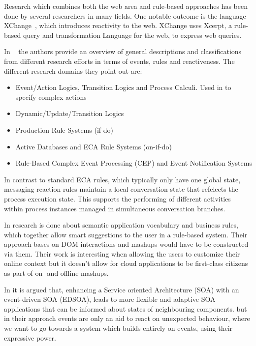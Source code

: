 \documentclass[11pt]{article}%
\begin{document}
Research which combines both the web area and rule-based approaches has been done by several researchers in many fields. One notable outcome is the language XChange~\cite{2005-Bry_etal-XChange.pdf}, which introduces reactivity to the web. XChange uses Xcerpt\cite{2004-Schaffert-Xcerpt.pdf}, a rule-based query and transformation Language for the web, to express web queries.

In ~\cite{2009-Paschke_Boley-RCER.pdf} the authors provide an overview of general descriptions and classifications from different research efforts in terms of events, rules and reactiveness. The different research domains they point out are:
 \begin{itemize}
  \item Event/Action Logics, Transition Logics and Process Calculi. Used in \cite{Behrends:2008:EEA:1377798.1377801} to specify complex actions
  \item Dynamic/Update/Transition Logics
  \item Production Rule Systems (if-do)
  \item Active Databases and ECA Rule Systems (on-if-do)
  \item Rule-Based Complex Event Processing (CEP) and Event Notification Systems
\end{itemize}
In contrast to standard ECA rules, which typically only have one global state, messaging reaction rules maintain a local conversation state that refelects the process execution state. This supports the performing of different activities within process instances managed in simultaneous conversation branches.

In \cite{2012-Giurca_etal-RuleTheWeb.pdf} research is done about semantic application vocabulary and business rules, which together allow smart suggestions to the user in a rule-based system. Their approach bases on DOM interactions and mashups would have to be constructed via them. Their work is interesting when allowing the users to customize their online context but it doesn't allow for cloud applications to be first-class citizens as part of on- and offline mashups.

In \cite{2010-Ye_Jacobsen-EEWS.pdf} it is argued that, enhancing a Service oriented Architecture (SOA) with an event-driven SOA (EDSOA), leads to more flexible and adaptive SOA applications that can be informed about states of neighbouring components. but in their approach events are only an aid to react on unexpected behaviour, where we want to go towards a system which builds entirely on events, using their expressive power.
\end{document}
